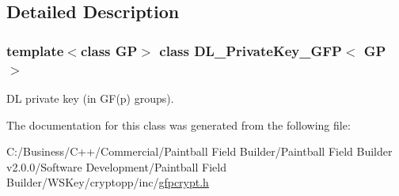 \subsection{Detailed Description}
\subsubsection*{template$<$class GP$>$ class DL\_\-PrivateKey\_\-GFP$<$ GP $>$}

DL private key (in GF(p) groups). 

The documentation for this class was generated from the following file:\begin{DoxyCompactItemize}
\item 
C:/Business/C++/Commercial/Paintball Field Builder/Paintball Field Builder v2.0.0/Software Development/Paintball Field Builder/WSKey/cryptopp/inc/\hyperlink{gfpcrypt_8h}{gfpcrypt.h}\end{DoxyCompactItemize}
